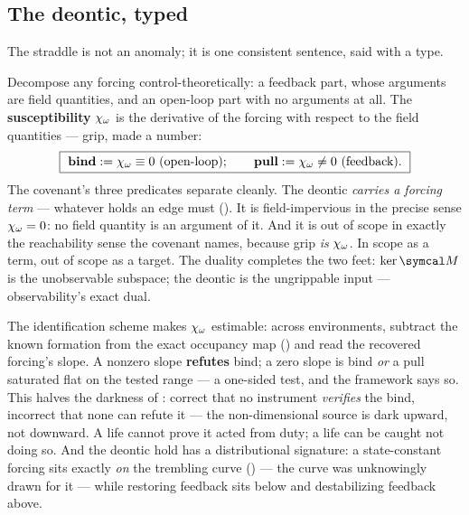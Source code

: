\documentclass[../main]{subfiles}
\begin{document}
\subsection{The deontic, typed}
\label{subsec:still:deontic}
%
The straddle is not an anomaly; it is one consistent sentence, said with a type.

\begin{definition}
  Decompose any forcing control-theoretically: a feedback part, whose arguments are
  field quantities, and an open-loop part with no arguments at all. The
  \textbf{susceptibility} $\chi\sb{\omega}$ is the derivative of the forcing with respect to
  the field quantities --- grip, made a number:
  \begin{equation}
    \boxed{\ \textbf{bind}:=\suscept\equiv0\ \text{(open-loop)};\qquad
      \textbf{pull}:=\suscept\neq0\ \text{(feedback)}.\ }
    \label{eq:deon:open}
  \end{equation}
  The covenant's three predicates separate cleanly. The deontic \emph{carries a
  forcing term} --- whatever holds an edge must (). It is
  field-impervious in the precise sense $\chi\sb{\omega}=0$: no field quantity is an argument
  of it. And it is out of scope in exactly the reachability sense the covenant names,
  because grip \emph{is} $\chi\sb{\omega}$. In scope as a term, out of scope as a target.
  The duality completes the two feet: $\ker\readout$ is the unobservable subspace;
  the deontic is the ungrippable input --- observability's exact dual.
\end{definition}

\begin{theorem}
  The identification scheme makes $\chi\sb{\omega}$ estimable: across environments, subtract
  the known formation from the exact occupancy map () and read the
  recovered forcing's slope. A nonzero slope \textbf{refutes} bind; a zero slope is
  bind \emph{or} a pull saturated flat on the tested range --- a one-sided test, and
  the framework says so. This halves the darkness of : correct that no
  instrument \emph{verifies} the bind, incorrect that none can refute it --- the
  non-dimensional source is dark upward, not downward. A life cannot prove it acted
  from duty; a life can be caught not doing so. And the deontic hold has a
  distributional signature: a state-constant forcing sits exactly \emph{on} the
  trembling curve () --- the curve was unknowingly drawn
  for it --- while restoring feedback sits below and destabilizing feedback above.
\end{theorem}
\end{document}
